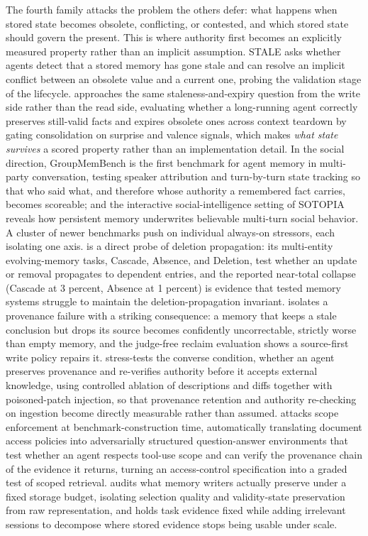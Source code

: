 The fourth family attacks the problem the others defer: what happens when stored state becomes obsolete, conflicting, or contested, and which stored state should govern the present. This is where authority first becomes an explicitly measured property rather than an implicit assumption. STALE \citep{chao2026stalellmagentsknow} asks whether agents detect that a stored memory has gone stale and can resolve an implicit conflict between an obsolete value and a current one, probing the validation stage of the lifecycle. \citet{han2026memorydepth} approaches the same staleness-and-expiry question from the write side rather than the read side, evaluating whether a long-running agent correctly preserves still-valid facts and expires obsolete ones across context teardown by gating consolidation on surprise and valence signals, which makes \emph{what state survives} a scored property rather than an implementation detail. In the social direction, GroupMemBench \citep{yang2026groupmembenchbenchmarkingllmagent} is the first benchmark for agent memory in multi-party conversation, testing speaker attribution and turn-by-turn state tracking so that who said what, and therefore whose authority a remembered fact carries, becomes scoreable; and the interactive social-intelligence setting of SOTOPIA \citep{zhou2024sotopiainteractiveevaluationsocial} reveals how persistent memory underwrites believable multi-turn social behavior. A cluster of newer benchmarks push on individual always-on stressors, each isolating one axis. \citet{jung2026meme} is a direct probe of deletion propagation: its multi-entity evolving-memory tasks, Cascade, Absence, and Deletion, test whether an update or removal propagates to dependent entries, and the reported near-total collapse (Cascade at 3 percent, Absence at 1 percent) is evidence that tested memory systems struggle to maintain the deletion-propagation invariant. \citet{kwon2026reclaim} isolates a provenance failure with a striking consequence: a memory that keeps a stale conclusion but drops its source becomes confidently uncorrectable, strictly worse than empty memory, and the judge-free reclaim evaluation shows a source-first write policy repairs it. \citet{zhang2026kpr} stress-tests the converse condition, whether an agent preserves provenance and re-verifies authority before it accepts external knowledge, using controlled ablation of descriptions and diffs together with poisoned-patch injection, so that provenance retention and authority re-checking on ingestion become directly measurable rather than assumed. \citet{wang2026docarena} attacks scope enforcement at benchmark-construction time, automatically translating document access policies into adversarially structured question-answer environments that test whether an agent respects tool-use scope and can verify the provenance chain of the evidence it returns, turning an access-control specification into a graded test of scoped retrieval. \citet{bhargava2026memaudit} audits what memory writers actually preserve under a fixed storage budget, isolating selection quality and validity-state preservation from raw representation, and \citet{shao2026scaleconditioned} holds task evidence fixed while adding irrelevant sessions to decompose where stored evidence stops being usable under scale. 